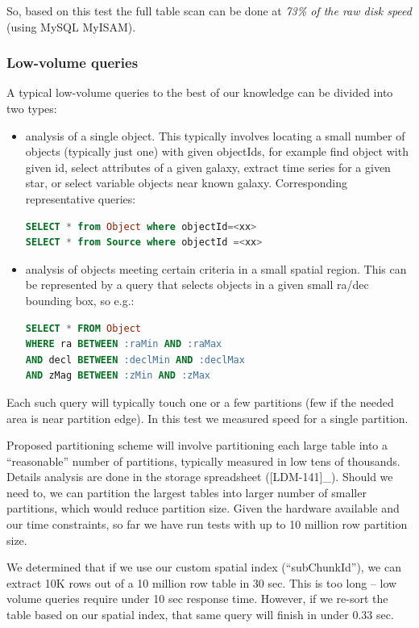 \documentclass[DM,lsstdraft,toc]{lsstdoc}
\begin{document}
So, based on this test the full table scan can be done at \emph{73\% of
the raw disk speed} (using MySQL MyISAM).

\subsubsection{Low-volume queries}\label{low-volume-queries}

A typical low-volume queries to the best of our knowledge can be divided
into two types:

\begin{itemize}
\item
  analysis of a single object. This typically involves locating a small
  number of objects (typically just one) with given objectIds, for
  example find object with given id, select attributes of a given
  galaxy, extract time series for a given star, or select variable
  objects near known galaxy. Corresponding representative queries:

\begin{lstlisting}[language=SQL]
SELECT * from Object where objectId=<xx>
SELECT * from Source where objectId =<xx>
\end{lstlisting}
\item
  analysis of objects meeting certain criteria in a small spatial
  region. This can be represented by a query that selects objects in a
  given small ra/dec bounding box, so e.g.:

\begin{lstlisting}[language=SQL]
SELECT * FROM Object
WHERE ra BETWEEN :raMin AND :raMax
AND decl BETWEEN :declMin AND :declMax
AND zMag BETWEEN :zMin AND :zMax
\end{lstlisting}
\end{itemize}

Each such query will typically touch one or a few partitions (few if the
needed area is near partition edge). In this test we measured speed for
a single partition.

Proposed partitioning scheme will involve partitioning each large table
into a ``reasonable'' number of partitions, typically measured in low
tens of thousands. Details analysis are done in the storage spreadsheet
({[}LDM-141{]}\_). Should we need to, we can partition the largest
tables into larger number of smaller partitions, which would reduce
partition size. Given the hardware available and our time constraints,
so far we have run tests with up to 10 million row partition size.

We determined that if we use our custom spatial index (``subChunkId''),
we can extract 10K rows out of a 10 million row table in 30 sec. This is
too long -- low volume queries require under 10 sec response time.
However, if we re-sort the table based on our spatial index, that same
query will finish in under 0.33 sec.
\end{document}
